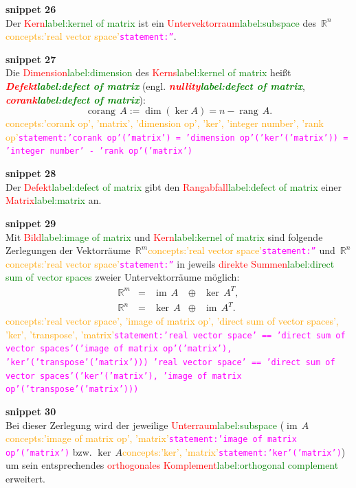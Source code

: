 \documentclass[a4paper,twoside,english,ngerman,deutsch,german,sectrefs,envcountsame,envcountchap]{svmono}
\newcommand{\setref}[2]{\textcolor{red}{#1}\textcolor{green}{#2}}
\newcommand{\snippet}[1]{\textbf{snippet #1}\\}
\newcommand{\eqnote}[2]{\textcolor{orange}{#1}\textcolor{magenta}{\texttt{#2}}}
\begin{document}
\snippet{26}
Der \setref{Kern}{label:kernel of matrix} ist ein \setref{Untervektorraum}{label:subspace} des~${\mathbb{R}}^{n}$\eqnote{concepts:'real vector space'}{statement:''}.

\snippet{27}
Die \setref{Dimension}{label:dimension} des \setref{Kerns}{label:kernel of matrix} heißt \textbf{\em \setref{Defekt}{label:defect of matrix}} (engl. \textbf{\em \setref{nullity}{label:defect of matrix}},
\textbf{\em \setref{corank}{label:defect of matrix}}):
\begin{equation}
{\operatorname{corang}}\,A:=\dim(\ker A)=n-{\operatorname{rang}}\,A.\label{eq:corank}
\end{equation}\eqnote{concepts:'corank op', 'matrix', 'dimension op', 'ker', 'integer number', 'rank op'}{statement:'corank op'('matrix') = 'dimension op'('ker'('matrix')) = 'integer number' - 'rank op'('matrix')}

\snippet{28}
Der \setref{Defekt}{label:defect of matrix} gibt den \setref{Rangabfall}{label:defect of matrix} einer \setref{Matrix}{label:matrix} an.

\snippet{29}
Mit \setref{Bild}{label:image of matrix} und \setref{Kern}{label:kernel of matrix} sind folgende Zerlegungen der Vektorräume~${\mathbb{R}}^{m}$\eqnote{concepts:'real vector space'}{statement:''} und~${\mathbb{R}}^{n}$\eqnote{concepts:'real vector space'}{statement:''} in jeweils \setref{direkte Summen}{label:direct sum of vector spaces} zweier Untervektorräume möglich:
\begin{equation}
\begin{array}{lcccc}
{\mathbb{R}}^{m} & = & {\operatorname{im}}\,A & \oplus & \ker\,A^{T},\\ {\mathbb{R}}^{n} & = & \ker\,A & \oplus & {\operatorname{im}}\,A^{T}.
\end{array}\label{eq:zerleg-im-ker}
\end{equation}\eqnote{concepts:'real vector space', 'image of matrix op', 'direct sum of vector spaces', 'ker', 'transpose', 'matrix'}{statement:'real vector space' == 'direct sum of vector spaces'('image of matrix op'('matrix'), 'ker'('transpose'('matrix')))
'real vector space' == 'direct sum of vector spaces'('ker'('matrix'), 'image of matrix op'('transpose'('matrix')))}

\snippet{30}
Bei dieser Zerlegung wird der jeweilige \setref{Unterraum}{label:subspace} ($\operatorname{im}\,A$\eqnote{concepts:'image of matrix op', 'matrix'}{statement:'image of matrix op'('matrix')} bzw. $\ker\,A$\eqnote{concepts:'ker', 'matrix'}{statement:'ker'('matrix')}) um sein entsprechendes \setref{orthogonales Komplement}{label:orthogonal complement} erweitert.
\end{document}
